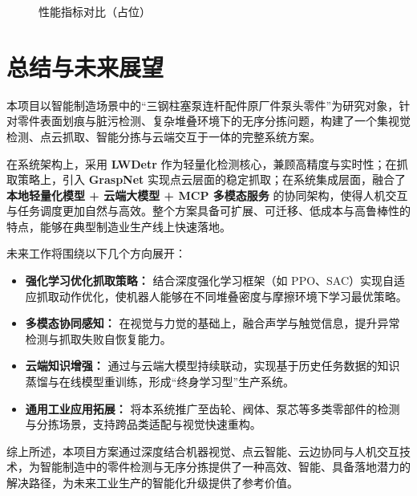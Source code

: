 \documentclass{cumcmthesis}
\begin{document}
\begin{figure}[htbp]\centering
{}
\caption{性能指标对比（占位）}\label{fig:metrics}
\end{figure}

\section{总结与未来展望}

本项目以智能制造场景中的“三钢柱塞泵连杆配件原厂件泵头零件”为研究对象，针对零件表面划痕与脏污检测、复杂堆叠环境下的无序分拣问题，构建了一个集视觉检测、点云抓取、智能分拣与云端交互于一体的完整系统方案。

在系统架构上，采用 \textbf{LWDetr} 作为轻量化检测核心，兼顾高精度与实时性；在抓取策略上，引入 \textbf{GraspNet} 实现点云层面的稳定抓取；在系统集成层面，融合了 \textbf{本地轻量化模型 + 云端大模型 + MCP 多模态服务} 的协同架构，使得人机交互与任务调度更加自然与高效。整个方案具备可扩展、可迁移、低成本与高鲁棒性的特点，能够在典型制造业生产线上快速落地。

未来工作将围绕以下几个方向展开：

\begin{itemize}
    \item \textbf{强化学习优化抓取策略：} 结合深度强化学习框架（如 PPO、SAC）实现自适应抓取动作优化，使机器人能够在不同堆叠密度与摩擦环境下学习最优策略。
    \item \textbf{多模态协同感知：} 在视觉与力觉的基础上，融合声学与触觉信息，提升异常检测与抓取失败自恢复能力。
    \item \textbf{云端知识增强：} 通过与云端大模型持续联动，实现基于历史任务数据的知识蒸馏与在线模型重训练，形成“终身学习型”生产系统。
    \item \textbf{通用工业应用拓展：} 将本系统推广至齿轮、阀体、泵芯等多类零部件的检测与分拣场景，支持跨品类适配与视觉快速重构。
\end{itemize}

综上所述，本项目方案通过深度结合机器视觉、点云智能、云边协同与人机交互技术，为智能制造中的零件检测与无序分拣提供了一种高效、智能、具备落地潜力的解决路径，为未来工业生产的智能化升级提供了参考价值。
\end{document}
